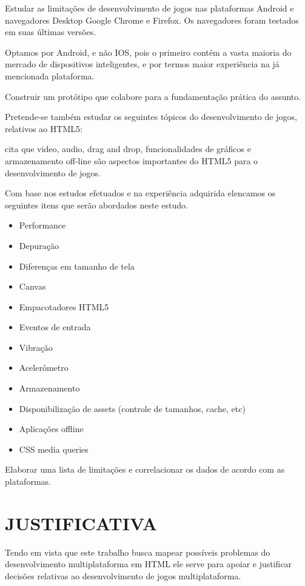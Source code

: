 \documentclass[
12pt,
a4paper,
portuges,
draft
]{report}
\begin{document}
Estudar as limitações de desenvolvimento de jogos nas plataformas
Android e navegadores Desktop Google Chrome
e Firefox. Os navegadores foram testados em suas últimas versões.

Optamos por Android, e não IOS, pois o primeiro contém
a vasta maioria do mercado de dispositivos inteligentes, e por termos
maior experiência na já mencionada plataforma.

Construir um protótipo que colabore para a fundamentação prática do assunto.

Pretende-se também estudar os seguintes tópicos do desenvolvimento de
jogos, relativos ao HTML5:

\cite{browserGamesTechnologyAndFuture} cita que video, audio, drag
and drop, funcionalidades de gráficos e armazenamento off-line são
aspectos importantes do HTML5 para o desenvolvimento de jogos.

Com base nos estudos efetuados e na experiência adquirida elencamos os
seguintes itens que serão abordados neste estudo.

\begin{itemize}
\item Performance
\item Depuração
\item Diferenças em tamanho de tela
\item Canvas
\item Empacotadores HTML5
\item Eventos de entrada
\item Vibração
\item Acelerômetro
\item Armazenamento
\item Disponibilização de assets (controle de tamanhos, cache, etc)
\item Aplicações offline
\item CSS media queries
\end{itemize}

Elaborar uma lista de limitações e correlacionar os dados de acordo
com as plataformas.


\chapter{JUSTIFICATIVA}

Tendo em vista que este trabalho busca mapear possíveis problemas
do desenvolvimento multiplataforma em HTML ele serve para apoiar
e justificar decisões relativas ao desenvolvimento de jogos
multiplataforma.
\end{document}
